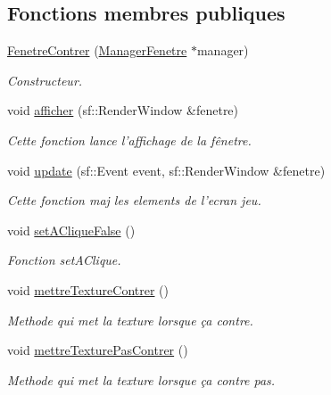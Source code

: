 \subsection*{\-Fonctions membres publiques}
\begin{DoxyCompactItemize}
\item 
\hypertarget{classFenetreContrer_ad12845e09d71a7a953f6c4c210372a2f}{\hyperlink{classFenetreContrer_ad12845e09d71a7a953f6c4c210372a2f}{\-Fenetre\-Contrer} (\hyperlink{classManagerFenetre}{\-Manager\-Fenetre} $\ast$manager)}\label{classFenetreContrer_ad12845e09d71a7a953f6c4c210372a2f}

\begin{DoxyCompactList}\small\item\em \-Constructeur. \end{DoxyCompactList}\item 
void \hyperlink{classFenetreContrer_a3682a7b1516367d2ff24e7ebd1ae3994}{afficher} (sf\-::\-Render\-Window \&fenetre)
\begin{DoxyCompactList}\small\item\em \-Cette fonction lance l'affichage de la fênetre. \end{DoxyCompactList}\item 
void \hyperlink{classFenetreContrer_af72ced88abfef3118fe2619566635ac3}{update} (sf\-::\-Event event, sf\-::\-Render\-Window \&fenetre)
\begin{DoxyCompactList}\small\item\em \-Cette fonction maj les elements de l'ecran jeu. \end{DoxyCompactList}\item 
\hypertarget{classFenetreContrer_ad3fdefb81ef4bd85a4898070cda895b5}{void \hyperlink{classFenetreContrer_ad3fdefb81ef4bd85a4898070cda895b5}{set\-A\-Clique\-False} ()}\label{classFenetreContrer_ad3fdefb81ef4bd85a4898070cda895b5}

\begin{DoxyCompactList}\small\item\em \-Fonction set\-A\-Clique. \end{DoxyCompactList}\item 
\hypertarget{classFenetreContrer_a50596263fbf3849d9930e086705e51cc}{void \hyperlink{classFenetreContrer_a50596263fbf3849d9930e086705e51cc}{mettre\-Texture\-Contrer} ()}\label{classFenetreContrer_a50596263fbf3849d9930e086705e51cc}

\begin{DoxyCompactList}\small\item\em \-Methode qui met la texture lorsque ça contre. \end{DoxyCompactList}\item 
\hypertarget{classFenetreContrer_aa99b1baabdeaf904ac58623223ec1064}{void \hyperlink{classFenetreContrer_aa99b1baabdeaf904ac58623223ec1064}{mettre\-Texture\-Pas\-Contrer} ()}\label{classFenetreContrer_aa99b1baabdeaf904ac58623223ec1064}

\begin{DoxyCompactList}\small\item\em \-Methode qui met la texture lorsque ça contre pas. \end{DoxyCompactList}\end{DoxyCompactItemize}


